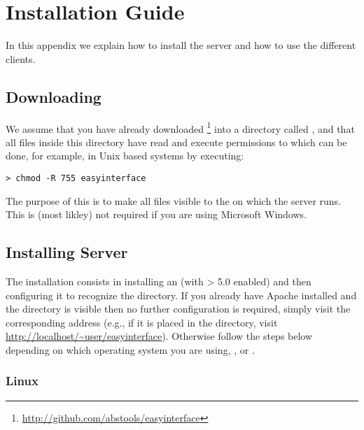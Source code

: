 {%
}

\chapter{Installation Guide}
\label{ch:installation}

In this appendix we explain how to install the server and how to use the
different clients.

\section{Downloading \ei}
\label{ch:installation:downloading}

We assume that you have already downloaded%
\footnote{\url{http://github.com/abstools/easyinterface}} 
%
\ei into a directory called , and that all files
inside this directory have read and execute permissions to
 which can be done, for example, in Unix based systems
by executing:

\medskip
\begin{lstlisting}
> chmod -R 755 easyinterface
\end{lstlisting}

\medskip
\noindent
The purpose of this is to make all files visible to the
 on which the \ei server runs.
This is (most likley) not required if you are using Microsoft Windows.

\section{Installing \ei Server}
\label{ch:installation:installing-server}

The installation consists in installing an 
(with  > 5.0 enabled) and then configuring it to recognize the
 directory. If you already have Apache installed
and the  directory is visible then no further
configuration is required, simply visit the corresponding address (e.g.,
if it is placed in the  directory, visit
\url{http://localhost/~user/easyinterface}). Otherwise follow the steps
below depending on which operating system you are using, ,
 or .

\subsection{Linux}\label{ch:installation:installing-server:linux}

